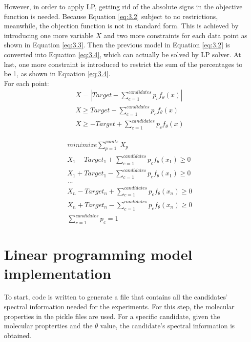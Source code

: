 However, in order to apply LP, getting rid of the absolute signs in the objective function is needed. Because Equation \ref{eq:3.2} subject to no restrictions, meanwhile, the objection function is not in standard form. This is achieved by introducing one more variable $X$ and two more constraints for each data point as shown in Equation \ref{eq:3.3}. Then the previous model in Equation \ref{eq:3.2} is converted into Equation \ref{eq:3.4}, which can actually be solved by LP solver. At last, one more constraint is introduced to restrict the sum of the percentages to be 1, as shown in Equation \ref{eq:3.4}. \\

For each point:
\begin{eqnarray} \label{eq:3.3}
& X = \left| Target-\displaystyle\sum^{candidates}_{c=1}p_{c}f_{\theta}(x) \right| \nonumber \\
&  X \geq Target-\displaystyle\sum^{candidates}_{c=1}p_{c}f_{\theta}(x)   \nonumber \\
& X \geq -Target+\displaystyle\sum^{candidates}_{c=1}p_{c}f_{\theta}(x)  
\end{eqnarray} 

\begin{eqnarray} \label{eq:3.4}
& minimize \displaystyle\sum^{points}_{p=1} X_p \nonumber \\
& X_1 - Target_1 + \displaystyle\sum^{candidates}_{c=1}p_{c}f_{\theta}(x_1) \geq 0 \nonumber \\
& X_1 + Target_1 - \displaystyle\sum^{candidates}_{c=1}p_{c}f_{\theta}(x_1) \geq 0 \nonumber \\
& ... \nonumber \\
& X_n - Target_n + \displaystyle\sum^{candidates}_{c=1}p_{c}f_{\theta}(x_n) \geq 0 \nonumber \\
& X_n + Target_n - \displaystyle\sum^{candidates}_{c=1}p_{c}f_{\theta}(x_n) \geq 0 \nonumber \\
& \displaystyle\sum^{candidates}_{c=1}p_{c} = 1 
\end{eqnarray} 

\section{Linear programming model implementation}

To start, code is written to generate a file that contains all the candidates' spectral information needed for the experiments. For this step, the molecular properties in the pickle files are used. For a specific candidate, given the molecular propterties and the $\theta$ value, the candidate's spectral information is obtained. \\

